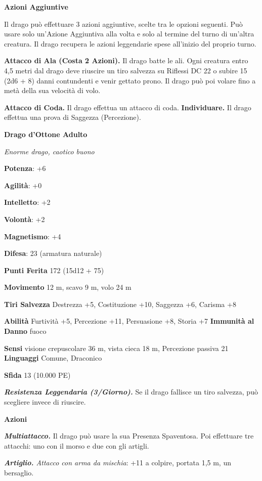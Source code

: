 \begin{multicols}{2}
\textbf{Azioni Aggiuntive}

Il drago può effettuare 3 azioni aggiuntive, scelte tra le opzioni
seguenti. Può usare solo un'Azione Aggiuntiva alla volta e solo al
termine del turno di un'altra creatura. Il drago recupera le azioni
leggendarie spese all'inizio del proprio turno.

\textbf{Attacco di Ala (Costa 2 Azioni).} Il drago batte le ali. Ogni
creatura entro 4,5 metri dal drago deve riuscire un tiro salvezza su Riflessi DC 22 o subire 15 (2d6 + 8) danni contundenti e venir gettato
prono. Il drago può poi volare fino a metà della sua velocità di volo.

\textbf{Attacco di Coda.} Il drago effettua un attacco di coda.
\textbf{Individuare.} Il drago effettua una prova di Saggezza
(Percezione).

\textbf{Drago d'Ottone Adulto}

\emph{Enorme drago, caotico buono}

\textbf{Potenza}: +6

\textbf{Agilità}: +0

\textbf{Intelletto}: +2

\textbf{Volontà}: +2

\textbf{Magnetismo}: +4

\textbf{Difesa}: 23 (armatura naturale)

\textbf{Punti Ferita} 172 (15d12 + 75)

\textbf{Movimento} 12 m, scavo 9 m, volo 24 m

\textbf{Tiri Salvezza} Destrezza +5, Costituzione +10, Saggezza +6,
Carisma +8

\textbf{Abilità} Furtività +5, Percezione +11, Persuasione +8, Storia +7
\textbf{Immunità al Danno} fuoco

\textbf{Sensi} visione crepuscolare 36 m, vista cieca 18 m, Percezione passiva
21 \textbf{Linguaggi} Comune, Draconico

\textbf{Sfida} 13 (10.000 PE)

\emph{\textbf{Resistenza Leggendaria (3/Giorno).}} Se il drago fallisce
un tiro salvezza, può scegliere invece di riuscire.

\textbf{Azioni}

\emph{\textbf{Multiattacco.}} Il drago può usare la sua Presenza
Spaventosa. Poi effettuare tre attacchi: uno con il morso e due con gli
artigli.

\emph{\textbf{Artiglio.} Attacco con arma da mischia}: +11 a colpire,
portata 1,5 m, un bersaglio.


\end{multicols}
